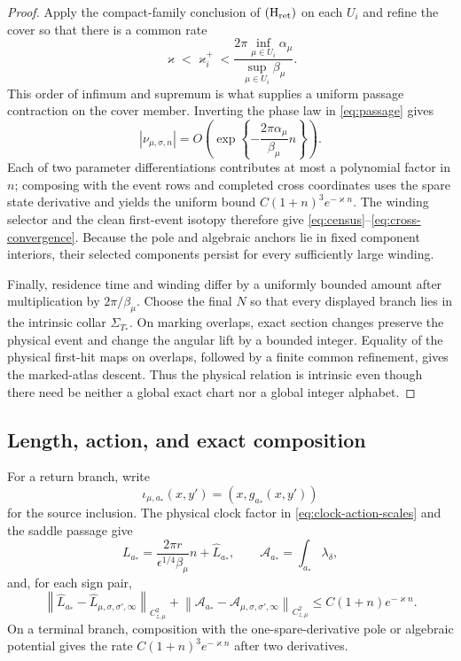 \documentclass[11pt,reqno]{amsart}
\numberwithin{equation}{section}
\theoremstyle{definition}
\theoremstyle{remark}
\newcommand{\cA}{\mathcal A}
\newcommand{\norm}[1]{\left\lVert #1\right\rVert}
\begin{document}
\begin{proof}
Apply the compact-family conclusion of \({\rm(H_{ret})}\) on each $U_i$ and
refine the cover so that there is a common rate
\begin{equation}\label{eq:cover-rate}
 \varkappa<\varkappa_i^+<
 \frac{2\pi\inf_{\mu\in U_i}\alpha_\mu}
      {\sup_{\mu\in U_i}\beta_\mu}.
\end{equation}
This order of infimum and supremum is what supplies a uniform passage
contraction on the cover member.  Inverting the phase law in
\eqref{eq:passage} gives
\[
 |\nu_{\mu,\sigma,n}|=
 O\!\left(\exp\left\{-\frac{2\pi\alpha_\mu}{\beta_\mu}n\right\}\right).
\]
Each of two parameter differentiations contributes at most a polynomial
factor in $n$; composing with the event rows and completed cross coordinates
uses the spare state derivative and yields the uniform bound
$C(1+n)^3e^{-\varkappa n}$.  The winding selector and the clean first-event
isotopy therefore give \eqref{eq:census}--\eqref{eq:cross-convergence}.
Because the pole and algebraic anchors lie in fixed component interiors,
their selected components persist for every sufficiently large winding.

Finally, residence time and winding differ by a uniformly bounded amount
after multiplication by $2\pi/\beta_\mu$.  Choose the final $N$ so that every
displayed branch lies in the intrinsic collar $\Sigma_{T_*}$.  On marking
overlaps, exact section changes preserve the physical event and change the
angular lift by a bounded integer.  Equality of the physical first-hit maps on
overlaps, followed by a finite common refinement, gives the marked-atlas
descent.  Thus the physical relation is intrinsic even though there need be
neither a global exact chart nor a global integer alphabet.
\end{proof}

\subsection{Length, action, and exact composition}

For a return branch, write
\[
 \iota_{\mu,a_*}(x,y')=(x,g_{a_*}(x,y'))
\]
for the source inclusion.  The physical clock factor in
\eqref{eq:clock-action-scales} and the saddle passage give
\begin{equation}\label{eq:return-length-action}
 L_{a_*}=\frac{2\pi r}{\epsilon^{1/4}\beta_\mu}n
           +\widehat L_{a_*},
 \qquad
 \cA_{a_*}=\int_{a_*}\lambda_\delta,
\end{equation}
and, for each sign pair,
\begin{equation}\label{eq:return-potentials}
 \norm{\widehat L_{a_*}-\widehat L_{\mu,\sigma,\sigma',\infty}}_{C^2_{z,\mu}}
 +\norm{\cA_{a_*}-\cA_{\mu,\sigma,\sigma',\infty}}_{C^2_{z,\mu}}
 \le C(1+n)e^{-\varkappa n}.
\end{equation}
On a terminal branch, composition with the one-spare-derivative pole or
algebraic potential gives the rate $C(1+n)^3e^{-\varkappa n}$ after two
derivatives.
\end{document}
